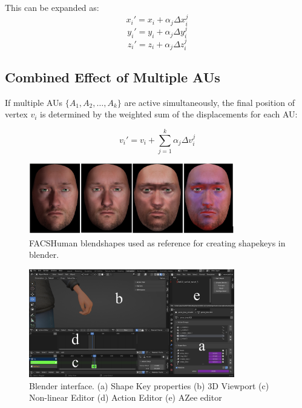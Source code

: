 \documentclass[../../main]{subfiles}
\begin{document}
This can be expanded as:
\[
x_i' = x_i + \alpha_j \Delta x_i^j
\]
\[
y_i' = y_i + \alpha_j \Delta y_i^j
\]
\[
z_i' = z_i + \alpha_j \Delta z_i^j
\]

\subsection{Combined Effect of Multiple AUs}
\label{ch:facial_expressions:blendshape_creation:combined_effect_of_multiple_aus}

If multiple AUs \( \{ A_1, A_2, \dots, A_k \} \) are active simultaneously, the final position of vertex \( v_i \) is determined by the weighted sum of the displacements for each AU:

\[
v_i' = v_i + \sum_{j=1}^{k} \alpha_j \Delta v_i^j
\]

\begin{figure}
    \centering
    \includegraphics[width=0.8\textwidth]{chapters/facial_expressions/images/facshuman_blendshapes.png}
    \caption{FACSHuman blendshapes used as reference for creating shapekeys in blender.}
    \label{ch:facial_expressions:fig:facshuman_blendshapes}
\end{figure}

\begin{figure}
    \centering
    \includegraphics[width=0.8\textwidth]{chapters/facial_expressions/images/shape_keys.png}
    \caption{Blender interface. (a) Shape Key properties (b) 3D Viewport (c) Non-linear Editor (d) Action Editor (e) AZee editor}
    \label{ch:facial_expressions:fig:shape_keys}
\end{figure}
\end{document}
